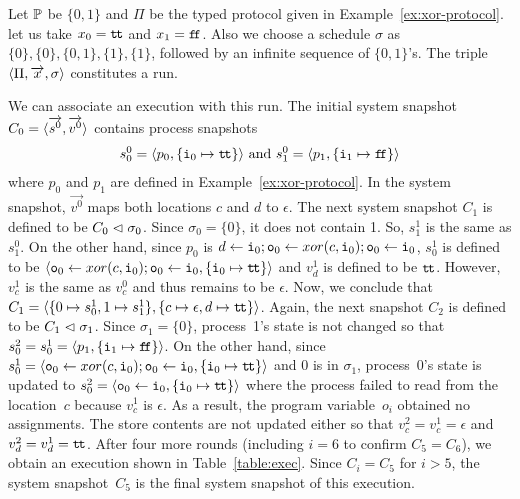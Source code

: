  \begin{example}
  Let $\mathbb{P}$ be $\{0,1\}$ and $\Pi$ be the typed protocol given in
  Example~\ref{ex:xor-protocol}.
  let us take $x_0 = \texttt{t\kern -1.2pt t}$ and $x_1 = \texttt{f\kern -1.7pt f}$.
  Also we choose a schedule $\sigma$ as
  $\{0\}, \{0\}, \{0,1\}, \{1\}, \{1\}$, followed by an infinite
  sequence of $\{0,1\}$'s.
  The triple $\langle{\Pi,\overrightarrow x,\sigma}\rangle$ constitutes a run.

  We can associate an execution with this run.
  The initial system snapshot $C_0=\langle{\overrightarrow{s^0},\overrightarrow{v^0}}\rangle$ contains
  process snapshots
  \begin{align*}
   s_0^0 = \langle{p_0,\{\texttt{i}_0\mapsto \texttt{t\kern -1.2pt t}\}}\rangle\text{ and }
   s_1^0 = \langle{p_1,\{\texttt{i}_1\mapsto \texttt{f\kern -1.7pt f}\}}\rangle
  \end{align*}
  where $p_0$ and $p_1$ are defined in Example~\ref{ex:xor-protocol}.
  In the system snapshot, $\vec{v^0}$ maps both locations $c$ and $d$ to
  $\epsilon$.
  The next system snapshot $C_1$ is defined to be $C_0\vartriangleleft\sigma_0$.
  Since $\sigma_0 = \{0\}$, it does not contain 1.
  So, $s_1^1$ is the same as $s_1^0$.
  On the other hand, since $p_0$ is $d\leftarrow \texttt{i}_0; \texttt{o}_0\leftarrow
  xor(c, \texttt{i}_0); \texttt{o}_0
   \leftarrow \texttt{i}_0$, $s_0^1$ is defined to be
  $\langle{\texttt{o}_0\leftarrow
  xor(c, \texttt{i}_0); \texttt{o}_0
   \leftarrow \texttt{i}_0, \{\texttt{i}_0\mapsto \texttt{t\kern -1.2pt t}\}}\rangle$ and
  $v_d^1$ is defined to be $\texttt{t\kern -1.2pt t}$.
  However, $v_c^1$ is the same as $v_c^0$ and thus remains to be
  $\epsilon$.
  Now, we conclude that $C_1=\langle{\{0\mapsto s_0^1,1\mapsto s_1^1\},
  \{c\mapsto \epsilon, d\mapsto \texttt{t\kern -1.2pt t}\}}\rangle$.
  Again, the next snapshot $C_2$ is defined to be $C_1\vartriangleleft \sigma_1$.
  Since $\sigma_1 = \{0\}$, process~1's state is not changed so that
  $s_0^2 = s_0^1 = \langle{p_1,\{\texttt{i}_1\mapsto\texttt{f\kern -1.7pt f}\}}\rangle$.
  On the other hand, since $s_0^1 = \langle{\texttt{o}_0\leftarrow
  xor(c, \texttt{i}_0); \texttt{o}_0
   \leftarrow \texttt{i}_0, \{\texttt{i}_0\mapsto \texttt{t\kern -1.2pt t}\}}\rangle$ and 0 is in $\sigma_1$,
  process~0's state is updated to
  $s_0^2 = \langle{\texttt{o}_0
   \leftarrow \texttt{i}_0, \{\texttt{i}_0\mapsto \texttt{t\kern -1.2pt t}\}}\rangle$
  where the process failed to read from the location~$c$ because $v_c^1$
  is $\epsilon$.  As a result, the program variable~$o_i$ obtained
  no assignments.
  The store contents are not updated either so that $v_c^2 = v_c^1 =
  \epsilon$ and $v_d^2 = v_d^1 = \texttt{t\kern -1.2pt t}$.
  After four more rounds (including $i = 6$ to confirm $C_5 = C_6$), we
  obtain an execution shown in Table~\ref{table:exec}.
  Since $C_i = C_5$ for $i > 5$, the system snapshot~$C_5$ is the final
  system snapshot of this execution.
 \end{example}

